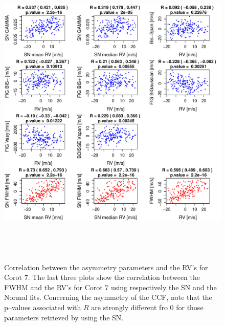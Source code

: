 \documentclass[11pt, oneside]{article}
\begin{document}
\begin{figure}[htbp]
   \centering
\includegraphics[height = 6in]{LRa01_E_[4]Comparison_para.pdf} 
   \caption{Correlation between the asymmetry parameters and the RV's for  $\text{Corot }7$. The last three plots show the correlation between the FWHM and the RV's for  $\text{Corot }7$ using respectively the SN and the Normal fits. Concerning the asymmetry of the CCF, note that the p--values associated with $R$ are strongly different fro $0$ for those parameters retrieved by using the SN.}
   \label{fig:Corot7:corrPlot}
\end{figure}
\end{document}

